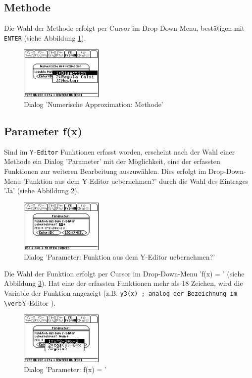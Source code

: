 \documentclass[a5paper,9pt]{scrreprt}
\begin{document}
\subsection*{Methode}
Die Wahl der Methode erfolgt per Cursor im Drop-Down-Menu, best\"atigen mit \verb|ENTER| (siehe Abbildung \ref{fig:MethodeApproximation}).
\begin{figure}[h]
  \centering
  \includegraphics[width=4cm]{img/nummeth_image010.png}
  \caption{Dialog 'Numerische Approximation: Methode’}
  \label{fig:MethodeApproximation}
\end{figure}

\newpage
\subsection*{Parameter f(x)}
Sind im \verb|Y-Editor| Funktionen erfasst worden, erscheint nach der Wahl einer Methode ein Dialog 'Parameter’ mit der M\"oglichkeit, eine der erfassten Funktionen zur weiteren Bearbeitung auszuw\"ahlen. Dies erfolgt im Drop-Down-Menu 'Funktion aus dem Y-Editor uebernehmen?’ durch die Wahl des Eintrages 'Ja’ (siehe Abbildung \ref{fig:ParameterFxFrage}).
\begin{figure}[h]
  \centering
  \includegraphics[width=4cm]{img/nummeth_image014.png}
  \caption{Dialog 'Parameter: Funktion aus dem Y-Editor uebernehmen?'}
  \label{fig:ParameterFxFrage}
\end{figure}

Die Wahl der Funktion erfolgt per Cursor im Drop-Down-Menu 'f(x) = ’ (siehe Abbildung \ref{fig:ParameterFxWahl}). Hat eine der erfassten Funktionen mehr als 18 Zeichen, wird die Variable der Funktion angezeigt (z.B. \verb|y3(x) ; analog der Bezeichnung im \verb|Y-Editor ).
\begin{figure}[h]
  \centering
  \includegraphics[width=4cm]{img/nummeth_image016.png}
  \caption{Dialog 'Parameter: f(x) = '}
  \label{fig:ParameterFxWahl}
\end{figure}
\end{document}
